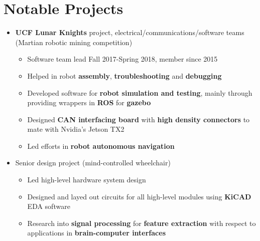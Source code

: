 \documentclass{my_resume}
\begin{document}
\section{Notable Projects}
\begin{itemize}
    \item \textbf{UCF Lunar Knights} project, electrical/communications/software teams (Martian robotic mining competition)
        \begin{itemize}
          \item Software team lead Fall 2017-Spring 2018, member since 2015
          \item Helped in robot \textbf{assembly}, \textbf{troubleshooting} and \textbf{debugging}
          \item Developed software for \textbf{robot simulation and testing}, mainly through providing wrappers
            in \textbf{ROS} for \textbf{gazebo}
          \item Designed \textbf{CAN interfacing board} with \textbf{high density connectors} to mate with Nvidia's Jetson TX2
          \item Led efforts in \textbf{robot autonomous navigation}
        \end{itemize}
      \item Senior design project (mind-controlled wheelchair)
        \begin{itemize}
            \item Led high-level hardware system design
            \item Designed and layed out circuits for all high-level modules using \textbf{KiCAD} EDA software
            \item Research into \textbf{signal processing} for \textbf{feature extraction} with respect to applications in \textbf{brain-computer interfaces}
        \end{itemize}
\end{itemize}
\end{document}
